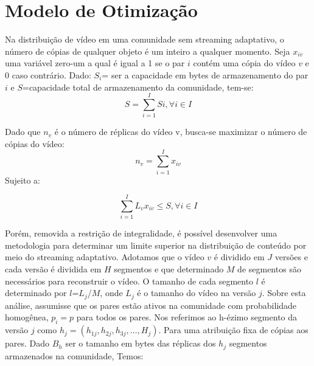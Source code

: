 \documentclass[
	12pt,				%
	oneside,			%
	a4paper,			%
	english,			%
	brazil				%
	]{abntex2ppgsi}
\begin{document}
\section{Modelo de Otimização}

Na distribuição de vídeo em uma comunidade sem streaming adaptativo, o número de cópias de qualquer objeto é um inteiro a qualquer momento. Seja $x_{iv}$ uma variável zero-um a qual é igual a 1 se o par $i$ contém uma cópia do vídeo $v$ e 0 caso contrário.
Dado: $S_i$= ser a capacidade em bytes de armazenamento do par $i$ e  $S$=capacidade total de armazenamento da comunidade, tem-se:
\begin{equation}
S=\sum_{i=1}^{I}Si,\forall i\in I
\end{equation}





Dado que $n_v$ é o número de réplicas do vídeo v, busca-se maximizar o número de cópias do vídeo:
\begin{equation}
n_{v}=\sum_{i=1}^{I}x_{iv}
	\label{eq:equacao-exemplo1}
\end{equation}
Sujeito a:

\begin{equation}
  \sum_{i=1}^{I}L_{v}x_{iv}\leq S, \forall i\in I
	\label{eq:equacao-exemplo3}
\end{equation}

\newcommand{\veth}{$h_{j}=(h_{1j},h_{2j},h_{3j},\ldots,H_j)$}
Porém, removida a restrição de integralidade, é possível desenvolver uma metodologia para determinar um limite superior na distribuição de conteúdo por meio do streaming adaptativo.
Adotamos que o vídeo $v$ é dividido em $J$ versões e cada versão é dividida em $H$ segmentos e que determinado $M$ de segmentos são necessários para reconstruir o vídeo. O tamanho de cada segmento $l$ é determinado por $l$=$L_j$/$M$, onde $L_j$ é o tamanho do vídeo na versão $j$.
Sobre esta análise, assumisse que os pares estão ativos na comunidade com probabilidade homogênea, $p_i=p$ para todos os pares.
Nos referimos ao h-ézimo segmento da versão $j$ como \veth. Para uma atribuição fixa de cópias aos pares. Dado $B_h$ ser o tamanho em bytes das réplicas dos $h_j$ segmentos armazenados na comunidade, Temos:
\end{document}
